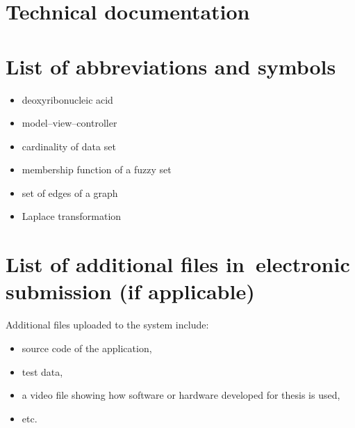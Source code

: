 \documentclass[a4paper,twoside,12pt]{book}
\begin{document}
\backmatter

\cleardoublepage
{}
\printbibliography           %

\begin{appendices}
\chapter{Technical documentation}


\chapter{List of abbreviations and symbols}

\begin{itemize}
\item[DNA] deoxyribonucleic acid
\item[MVC] model--view--controller 
\item[$N$] cardinality of data set
\item[$\mu$] membership function of a fuzzy set
\item[$\mathbb{E}$] set of edges of a graph
\item[$\mathcal{L}$] Laplace transformation
\end{itemize}

\chapter{List of additional files in~electronic submission (if applicable)}

Additional files uploaded to the system include:
\begin{itemize}
\item source code of the application,
\item test data,
\item a video file showing how software or hardware developed for thesis is used,
\item etc.
\end{itemize}



\listoffigures
{}
\listoftables
{}

\end{appendices}
\end{document}

